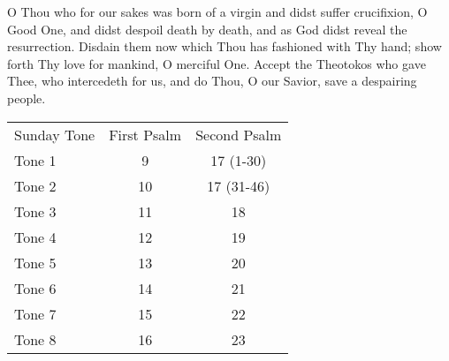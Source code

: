 \documentclass[
  14pt,
  letterpaper,
  openright,
  twocolumn,
  twoside]{memoir}
\begin{document}


 O Thou who for our sakes was born of a virgin and didst suffer crucifixion, O Good One, and didst despoil death by death, and as God didst reveal the resurrection. Disdain them now which Thou has fashioned with Thy hand; show forth Thy love for mankind, O merciful One. Accept the Theotokos who gave Thee, who intercedeth for us, and do Thou, O our Savior, save a despairing people.




{\noindent
\begin{tabular}{l | c | c}
  Sunday Tone & First Psalm & Second Psalm \\
  Tone 1 & 9  & 17 (1-30) \\
  Tone 2 & 10 & 17 (31-46) \\
  Tone 3 & 11 & 18 \\
  Tone 4 & 12 & 19 \\
  Tone 5 & 13 & 20 \\
  Tone 6 & 14 & 21 \\
  Tone 7 & 15 & 22 \\
  Tone 8 & 16 & 23
\end{tabular}
}

\choir\ \lhm\ \thrice\

\glory\

\reader\ \bothnow\


\end{document}
